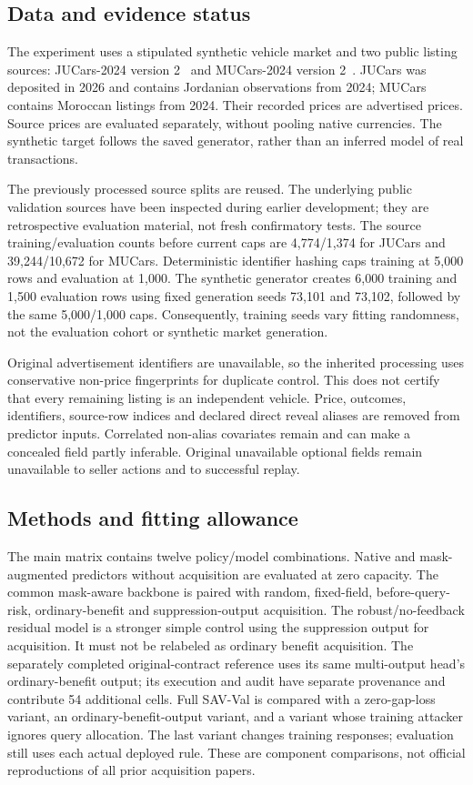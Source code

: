 \documentclass[10pt,journal]{IEEEtran}
\begin{document}
\subsection{Data and evidence status}
The experiment uses a stipulated synthetic vehicle market and two public
listing sources: JUCars-2024 version 2~\cite{thalji2026jucars} and
MUCars-2024 version 2~\cite{tabarnoust2024mucars}. JUCars was deposited in
2026 and contains Jordanian observations from 2024; MUCars contains
Moroccan listings from 2024. Their recorded prices are advertised prices.
Source prices are evaluated separately, without pooling native currencies.
The synthetic target follows the saved generator, rather than an inferred
model of real transactions.

The previously processed source splits are reused. The underlying public
validation sources have been inspected during earlier development; they
are retrospective evaluation material, not fresh confirmatory tests.
The source training/evaluation counts before current caps are 4,774/1,374
for JUCars and 39,244/10,672 for MUCars. Deterministic identifier hashing
caps training at 5,000 rows and evaluation at 1,000. The synthetic
generator creates 6,000 training and 1,500 evaluation rows using fixed
generation seeds 73,101 and 73,102, followed by the same 5,000/1,000 caps.
Consequently, training seeds vary fitting randomness, not the evaluation
cohort or synthetic market generation.

Original advertisement identifiers are unavailable, so the inherited
processing uses conservative non-price fingerprints for duplicate control.
This does not certify that every remaining listing is an independent
vehicle. Price, outcomes, identifiers, source-row indices and declared
direct reveal aliases are removed from predictor inputs. Correlated
non-alias covariates remain and can make a concealed field partly
inferable. Original unavailable optional fields remain unavailable to
seller actions and to successful replay.

\subsection{Methods and fitting allowance}
The main matrix contains twelve policy/model combinations. Native and
mask-augmented predictors without acquisition are evaluated at zero
capacity. The common mask-aware backbone is paired with random, fixed-field,
before-query-risk, ordinary-benefit and suppression-output acquisition.
The robust/no-feedback residual model is a stronger simple control using
the suppression output for acquisition. It must not be relabeled as ordinary
benefit acquisition. The separately completed original-contract reference
uses its same multi-output head's ordinary-benefit output; its execution and
audit have separate provenance and contribute 54 additional cells. Full
SAV-Val is compared with a zero-gap-loss variant, an ordinary-benefit-output
variant, and a variant whose training attacker ignores query allocation.
The last variant changes training responses; evaluation still uses each
actual deployed rule. These are component comparisons, not official
reproductions of all prior acquisition papers.
\end{document}
